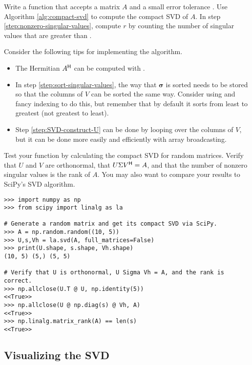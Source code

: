 \begin{problem} %
Write a function that accepts a matrix $A$ and a small error tolerance .
Use Algorithm \ref{alg:compact-svd} to compute the compact SVD of $A$.
In step \ref{step:nonzero-singular-values}, compute $r$ by counting the number of singular values that are greater than .

Consider the following tips for implementing the algorithm.
\begin{itemize}
    \item The Hermitian $A^{\mathsf H}$ can be computed with .
    \item In step \ref{step:sort-singular-values}, the way that $\boldsymbol{\sigma}$ is sorted needs to be stored so that the columns of $V$ can be sorted the same way.
    Consider using  and fancy indexing to do this, but remember that by default it sorts from least to greatest (not greatest to least).
    \item Step \ref{step:SVD-construct-U} can be done by looping over the columns of $V$, but it can be done more easily and efficiently with array broadcasting.
\end{itemize}

Test your function by calculating the compact SVD for random matrices.
Verify that $U$ and $V$ are orthonormal, that $U\Sigma V^{\mathsf H} = A$, and that the number of nonzero singular values is the rank of $A$.
You may also want to compare your results to SciPy's SVD algorithm.
%
\begin{lstlisting}
>>> import numpy as np
>>> from scipy import linalg as la

# Generate a random matrix and get its compact SVD via SciPy.
>>> A = np.random.random((10, 5))
>>> U,s,Vh = la.svd(A, full_matrices=False)
>>> print(U.shape, s.shape, Vh.shape)
(10, 5) (5,) (5, 5)

# Verify that U is orthonormal, U Sigma Vh = A, and the rank is correct.
>>> np.allclose(U.T @ U, np.identity(5))
<<True>>
>>> np.allclose(U @ np.diag(s) @ Vh, A)
<<True>>
>>> np.linalg.matrix_rank(A) == len(s)
<<True>>
\end{lstlisting}
\label{prob:calculate-compact-svd}
\end{problem}

\subsection*{Visualizing the SVD} %

